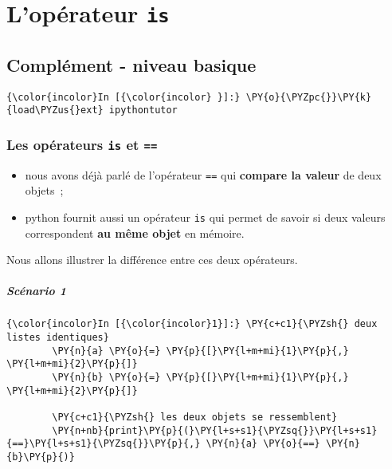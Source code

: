     \hypertarget{lopuxe9rateur-is}{%
\section{\texorpdfstring{L'opérateur
\texttt{is}}{L'opérateur is}}\label{lopuxe9rateur-is}}

    \hypertarget{compluxe9ment---niveau-basique}{%
\subsection{Complément - niveau
basique}\label{compluxe9ment---niveau-basique}}

    \begin{Verbatim}[commandchars=\\\{\}]
{\color{incolor}In [{\color{incolor} }]:} \PY{o}{\PYZpc{}}\PY{k}{load\PYZus{}ext} ipythontutor
\end{Verbatim}


    \hypertarget{les-opuxe9rateurs-is-et}{%
\subsubsection{\texorpdfstring{Les opérateurs \texttt{is} et
\texttt{==}}{Les opérateurs is et ==}}\label{les-opuxe9rateurs-is-et}}

    \begin{itemize}
\tightlist
\item
  nous avons déjà parlé de l'opérateur \texttt{==} qui \textbf{compare
  la valeur} de deux objets~;
\item
  python fournit aussi un opérateur \texttt{is} qui permet de savoir si
  deux valeurs correspondent \textbf{au même objet} en mémoire.
\end{itemize}

Nous allons illustrer la différence entre ces deux opérateurs.

    \hypertarget{scuxe9nario-1}{%
\subparagraph{Scénario 1}\label{scuxe9nario-1}}

    \begin{Verbatim}[commandchars=\\\{\}]
{\color{incolor}In [{\color{incolor}1}]:} \PY{c+c1}{\PYZsh{} deux listes identiques}
        \PY{n}{a} \PY{o}{=} \PY{p}{[}\PY{l+m+mi}{1}\PY{p}{,} \PY{l+m+mi}{2}\PY{p}{]}
        \PY{n}{b} \PY{o}{=} \PY{p}{[}\PY{l+m+mi}{1}\PY{p}{,} \PY{l+m+mi}{2}\PY{p}{]}
        
        \PY{c+c1}{\PYZsh{} les deux objets se ressemblent}
        \PY{n+nb}{print}\PY{p}{(}\PY{l+s+s1}{\PYZsq{}}\PY{l+s+s1}{==}\PY{l+s+s1}{\PYZsq{}}\PY{p}{,} \PY{n}{a} \PY{o}{==} \PY{n}{b}\PY{p}{)}
\end{Verbatim}


